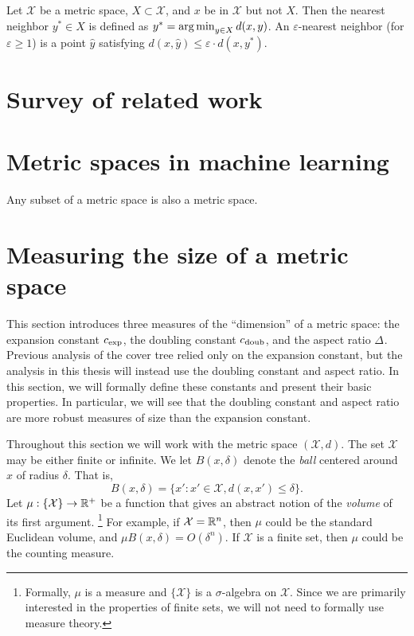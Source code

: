 \documentclass[../main.tex]{subfiles}
\newcommand{\set}[1]{\mathcal {#1}}
\newcommand{\dist}[2]{\distf({#1},{#2})}
\newcommand{\distf}{d}
\newcommand{\aspect}[1]{\Delta_{#1}}
\newcommand{\cexp}{c_\textnormal{exp}}
\newcommand{\cdoub}{c_\textnormal{doub}}
\begin{document}
\begin{definition}
    Let $\set X$ be a metric space, $X\subset\set X$, and $x$ be in $\set X$ but not $X$.
    Then the nearest neighbor $y^*\in X$ is defined as $y^*=\argmin_{y\in X} \dist{x}{y}$.
    An $\varepsilon$-nearest neighbor (for $\varepsilon\ge1$) is a point $\hat y$ satisfying $\dist{x}{\hat y} \le \varepsilon \cdot\dist{x}{y^*}$.
\end{definition}
\newcommand{\eann}{(1+\varepsilon)\text{-ann}}


\section{Survey of related work}


\section{Metric spaces in machine learning}

\begin{example}
    Any subset of a metric space is also a metric space.
\end{example}



\section{Measuring the size of a metric space}

This section introduces three measures of the ``dimension'' of a metric space:
the expansion constant $\cexp$, the doubling constant $\cdoub$, and the aspect ratio $\aspect{}$.
Previous analysis of the cover tree relied only on the expansion constant,
but the analysis in this thesis will instead use the doubling constant and aspect ratio.
In this section, we will formally define these constants and present their basic properties.
In particular, we will see that the doubling constant and aspect ratio are more robust measures of size than the expansion constant.

Throughout this section we will work with the metric space $(\set X,d)$.
The set $\set X$ may be either finite or infinite.
We let $B(x,\delta)$ denote the \emph{ball} centered around $x$ of radius $\delta$. 
That is,
\begin{equation}
    B(x,\delta) = \{ x' : x'\in\set X, \dist{x}{x'} \le \delta \}.
\end{equation}
Let $\mu : \{\set X\} \to \R^+$ be a function that gives an abstract notion of the \emph{volume} of its first argument.%
\footnote{
    Formally, $\mu$ is a measure and $\{\set X\}$ is a $\sigma$-algebra on $\set X$.
    Since we are primarily interested in the properties of finite sets,
    we will not need to formally use measure theory.
}
For example, if $\set X=\R^n$, then $\mu$ could be the standard Euclidean volume,
and $\mu B(x,\delta) = O(\delta^n)$.
If $\set X$ is a finite set, then $\mu$ could be the counting measure.
\end{document}
